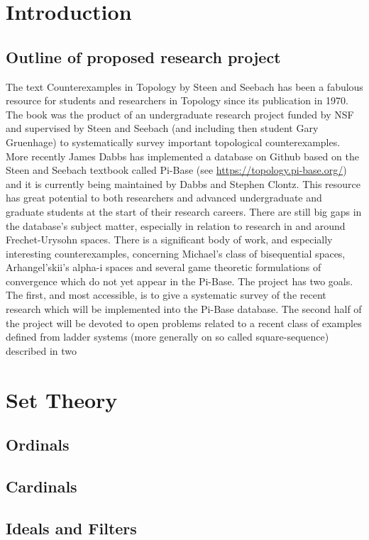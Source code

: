 \documentclass{article}
\begin{document}
\section{Introduction}
\subsection{Outline of proposed research project}

The text Counterexamples in Topology by Steen and Seebach has been a fabulous resource for students and
researchers in Topology since its publication in 1970. The book was the product of an undergraduate research
project funded by NSF and supervised by Steen and Seebach (and including then student Gary Gruenhage) to
systematically survey important topological counterexamples. More recently James Dabbs has implemented a
database on Github based on the Steen and Seebach textbook called Pi-Base (see \href{https://topology.pi-base.org/}{https://topology.pi-base.org/})
and it is currently being maintained by Dabbs and Stephen Clontz. This resource has great potential to both
researchers and advanced undergraduate and graduate students at the start of their research careers. There are
still big gaps in the database's subject matter, especially in relation to research in and around Frechet-Urysohn
spaces. There is a significant body of work, and especially interesting counterexamples, concerning Michael's
class of bisequential spaces, Arhangel'skii's alpha-i spaces and several game theoretic formulations of
convergence which do not yet appear in the Pi-Base. The project has two goals. The first, and most accessible,
is to give a systematic survey of the recent research which will be implemented into the Pi-Base database. The
second half of the project will be devoted to open problems related to a recent class of examples defined from
ladder systems (more generally on so called square-sequence) described in two 


\section{Set Theory}
\subsection{Ordinals}
\subsection{Cardinals}
\subsection{Ideals and Filters}
\end{document}

